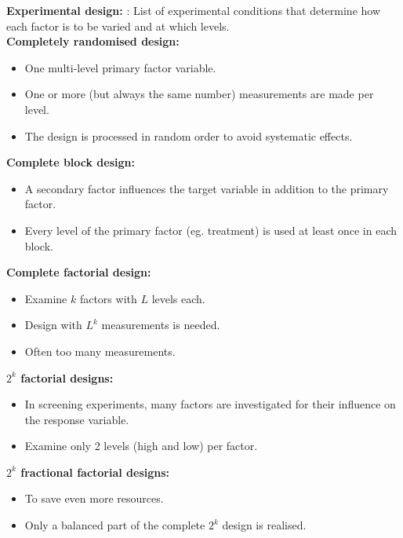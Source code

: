 \textbf{Experimental design:} : List of experimental conditions that determine how each factor is to be varied and at which levels.\\

\textbf{Completely randomised design:}
\begin{itemize}
  \item One multi-level primary factor variable.
  \item One or more (but always the same number) measurements are made per level.
  \item The design is processed in random order to avoid systematic effects.
\end{itemize}

\textbf{Complete block design:}
\begin{itemize}
  \item A secondary factor influences the target variable in addition to the primary factor.
  \item Every level of the primary factor (eg. treatment) is used at least once in each block.
\end{itemize}

\textbf{Complete factorial design:}
\begin{itemize}
  \item Examine $k$ factors with $L$ levels each.
  \item Design with $L^k$ measurements is needed.
  \item Often too many measurements.
\end{itemize}

\textbf{$2^k$ factorial designs:}
\begin{itemize}
  \item In screening experiments, many factors are investigated for their influence on the response variable.
  \item Examine only 2 levels (high and low) per factor.
\end{itemize}

\textbf{$2^k$ fractional factorial designs:}
\begin{itemize}
  \item To save even more resources.
  \item Only a balanced part of the complete $2^k$ design is realised.
\end{itemize}

